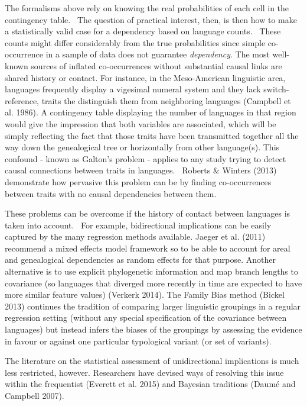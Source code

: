 \documentclass[11pt]{article}
\newenvironment{styleStandard}{\setlength\leftskip{0in}\setlength\rightskip{0in}\setlength\parindent{0in}\setlength\parfillskip{0pt plus 1fil}\setlength\parskip{0in plus 1pt}\writerlistparindent\writerlistleftskip\leavevmode\normalfont\normalsize\writerlistlabel\ignorespaces}{\unskip\vspace{0in plus 1pt}\par}
\newcommand\writerlistleftskip{}
\newcommand\writerlistparindent{}
\newcommand\writerlistlabel{}
\begin{document}
\begin{styleStandard}
The formalisms above rely on knowing the real probabilities of each cell in the contingency table. \ The question of practical interest, then, is then how to make a statistically valid case for a dependency based on language counts. \ These counts might differ considerably from the true probabilities since simple co-occurrence in a sample of data does not guarantee \textit{dependency}. The most well-known sources of inflated co-occurrences without substantial causal links are shared history or contact. For instance, in the Meso-American linguistic area, languages frequently display a vigesimal numeral system and they lack switch-reference, traits the distinguish them from neighboring languages (Campbell et al. 1986). A contingency table displaying the number of languages in that region would give the impression that both variables are associated, which will be simply reflecting the fact that those traits have been transmitted together all the way down the genealogical tree or horizontally from other language(s). This confound - known as Galton’s problem - applies to any study trying to detect causal connections between traits in languages. \ Roberts \& Winters (2013) demonstrate how pervasive this problem can be by finding co-occurrences between traits with no causal dependencies between them. \ 
\end{styleStandard}


\begin{styleStandard}
These problems can be overcome if the history of contact between languages is taken into account. \ For example, bidirectional implications can be easily captured by the many regression methods available. Jaeger et al. (2011) recommend a mixed effects model framework so to be able to account for areal and genealogical dependencies as random effects for that purpose. Another alternative is to use explicit phylogenetic information and map branch lengths to covariance (so languages that diverged more recently in time are expected to have more similar feature values) (Verkerk 2014). The Family Bias method (Bickel 2013) continues the tradition of comparing larger linguistic groupings in a regular regression setting (without any special specification of the covariance between languages) but instead infers the biases of the groupings by assessing the evidence in favour or against one particular typological variant (or set of variants).
\end{styleStandard}


\begin{styleStandard}
The literature on the statistical assessment of unidirectional implications is much less restricted, however. Researchers have devised ways of resolving this issue within the frequentist (Everett et al. 2015) and Bayesian traditions (Daumé and Campbell 2007).
\end{styleStandard}
\end{document}
